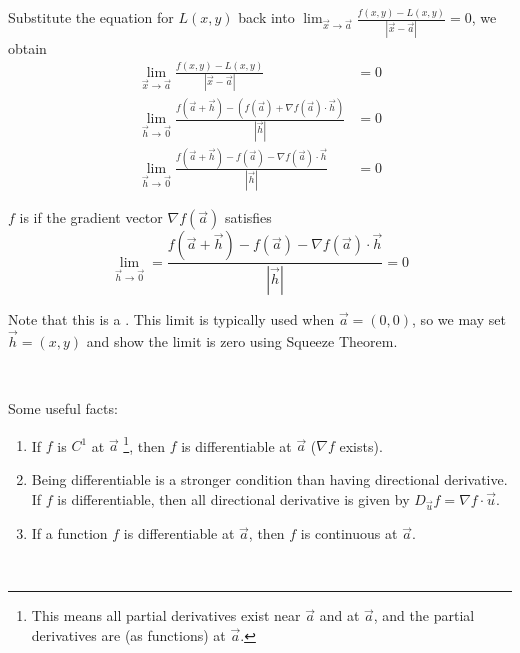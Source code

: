 \documentclass[11pt,fleqn]{book} %
\begin{document}
Substitute the equation for $L(x,y)$ back into $\lim_{\vec{x}\to\vec{a}} \frac{f(x,y) - L(x,y)}{| \vec{x} - \vec{a} |} = 0$, we obtain 
\begin{align*}
    \lim_{\vec{x}\to\vec{a}} \frac{f(x,y) - L(x,y)}{| \vec{x} - \vec{a} |} &= 0 \\
    \lim_{\vec{h}\to\vec{0}} \frac{f(\vec{a} + \vec{h}) - \left( f(\vec{a}) + \nabla f(\vec{a}) \cdot \vec{h} \right)}{| \vec{h} |} &= 0 \\
    \lim_{\vec{h}\to\vec{0}} \frac{f(\vec{a} + \vec{h}) - f(\vec{a}) - \nabla f(\vec{a}) \cdot \vec{h}}{| \vec{h} |} &= 0
\end{align*}

\begin{definition}[Differentiable]
    $f$ is  if the gradient vector $\nabla f(\vec{a})$ satisfies $$\lim_{\vec{h} \to \vec{0}} = \frac{f(\vec{a} + \vec{h}) - f(\vec{a}) - \nabla f(\vec{a}) \cdot \vec{h}}{| \vec{h} |} = 0$$
\end{definition}

Note that this is a . This limit is typically used when $\vec{a} = (0, 0)$, so we may set $\vec{h} = (x, y)$ and show the limit is zero using Squeeze Theorem.

{~~~}

Some useful facts:

\begin{enumerate}
    \item If $f$ is $C^1$ at $\vec{a}$ \footnote{This means all partial derivatives exist near $\vec{a}$ and at $\vec{a}$, and the partial derivatives are  (as functions) at $\vec{a}$. }, then $f$ is differentiable at $\vec{a}$ ($\nabla f$ exists). 

    \item Being differentiable is a stronger condition than having directional derivative. If $f$ is differentiable, then all directional derivative is given by $D_{\vec{u}} f = \nabla f \cdot \vec{u}$. 

    \item If a function $f$ is differentiable at $\vec{a}$, then $f$ is continuous at $\vec{a}$.
\end{enumerate}

{~~~}
\end{document}
